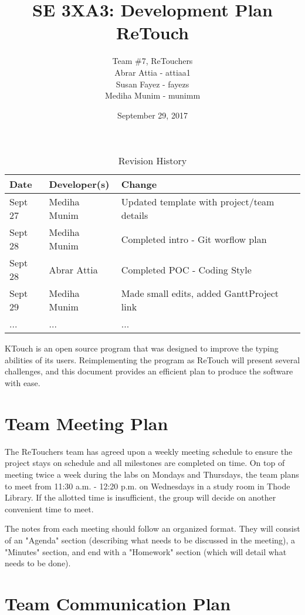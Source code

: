 \documentclass{article}
\title{SE 3XA3: Development Plan\\ReTouch}
\author{Team \#7, ReTouchers
		\\ Abrar Attia - attiaa1
		\\ Susan Fayez - fayezs
		\\ Mediha Munim - munimm
}
\date{September 29, 2017}
\begin{document}
\begin{table}[hp]
\caption{Revision History} \label{TblRevisionHistory}
\begin{tabularx}{\textwidth}{llX}
\toprule
\textbf{Date} & \textbf{Developer(s)} & \textbf{Change}\\
\midrule
Sept 27 & Mediha Munim & Updated template with project/team details\\
Sept 28 & Mediha Munim & Completed intro - Git worflow plan\\
Sept 28 & Abrar Attia & Completed POC - Coding Style\\
Sept 29 & Mediha Munim & Made small edits, added GanttProject link\\
... & ... & ...\\
\bottomrule
\end{tabularx}
\end{table}

\newpage

\maketitle

KTouch is an open source program that was designed to improve the typing abilities of its users. Reimplementing the program as ReTouch will present several challenges, and this document provides an efficient plan to produce the software with ease.

\section{Team Meeting Plan}

	The ReTouchers team has agreed upon a weekly meeting schedule to ensure the project stays on schedule and all milestones are completed on time. On top of meeting twice a week during the labs on Mondays and Thursdays, the team plans to meet from 11:30 a.m. - 12:20 p.m. on Wednesdays in a study room in Thode Library. If the allotted time is insufficient, the group will decide on another convenient time to meet. 

The notes from each meeting should follow an organized format. They will consist of an "Agenda" section (describing what needs to be discussed in the meeting), a "Minutes" section, and end with a "Homework" section (which will detail what needs to be done).

\section{Team Communication Plan}
\end{document}
